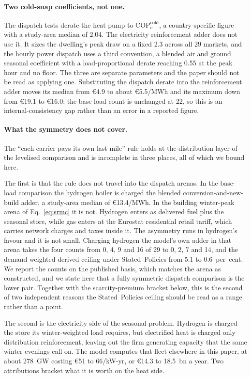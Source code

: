 \paragraph{Two cold-snap coefficients, not one.} The dispatch tests derate the heat
pump to $\mathrm{COP}^{\mathrm{cold}}_{c}$, a country-specific figure with a study-area
median of 2.04. The electricity reinforcement adder does not use it. It sizes the dwelling's peak
draw on a fixed 2.3 across all 29 markets, and the hourly power dispatch uses a third
convention, a blended air and ground seasonal coefficient with a load-proportional derate
reaching 0.55 at the peak hour and no floor. The three are separate parameters and the
paper should not be read as applying one. Substituting the dispatch derate into the
reinforcement adder moves its median from \euro{}4.9 to about \euro{}5.5/MWh and its
maximum down from \euro{}19.1 to \euro{}16.0; the base-load count is unchanged at 22, so
this is an internal-consistency gap rather than an error in a reported figure.

\paragraph{What the symmetry does not cover.} The ``each carrier pays its own last mile''
rule holds at the distribution layer of the levelised comparison and is incomplete in
three places, all of which we bound here.

The first is that the rule does not travel into the dispatch arenas. In the base-load
comparison the hydrogen boiler is charged the blended conversion-and-new-build adder, a
study-area median of \euro{}13.4/MWh. In the building winter-peak arena of
Eq.~\eqref{eq:srmc} it is not. Hydrogen enters as delivered fuel plus the seasonal store,
while gas enters at the Eurostat residential retail tariff, which carries network charges
and taxes inside it. The asymmetry runs in hydrogen's favour and it is not small.
Charging hydrogen the model's own adder in that arena takes the four counts from 0, 4, 9
and 16 of 29 to 0, 2, 7 and 14, and the demand-weighted derived ceiling under
Stated~Policies from 5.1 to 0.6~per~cent. We report the counts on the published basis, which matches the arena as constructed, and we state here that a fully symmetric
dispatch comparison is the lower pair. Together with the scarcity-premium bracket below,
this is the second of two independent reasons the Stated~Policies ceiling should be read
as a range rather than a point.

The second is the electricity side of the seasonal problem. Hydrogen is
charged the store its winter-weighted load requires, but electrified heat is charged
only distribution reinforcement, leaving out the firm generating capacity that the same
winter evenings call on. The model computes that fleet elsewhere in this paper, at about 278~GW costing \euro{}51 to 66/kW-yr, or \euro{}14.3 to 18.5~bn a year. Two attributions
bracket what it is worth on the heat side.

